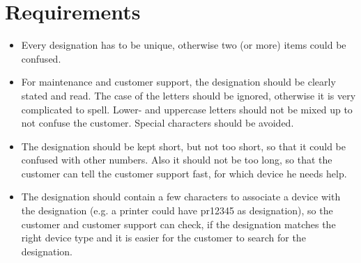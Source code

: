 %
%
%
%
%
%
%

\section{Requirements}

\begin{itemize}
	\item Every designation has to be unique, otherwise two (or more) items
		could be confused.

	\item For maintenance and customer support, the designation should be
		clearly stated and read. The case of the letters should be ignored,
		otherwise it is very complicated to spell. Lower- and uppercase letters
		should not be mixed up to not confuse the customer. Special characters
		should be avoided.

	\item The designation should be kept short, but not too short, so that it
		could be confused with other numbers. Also it should not be too long, so
		that the customer can tell the customer support fast, for which device
		he needs help.

	\item The designation should contain a few characters to associate a device
		with the designation (e.g. a printer could have pr12345 as designation),
		so the customer and customer support can check, if the designation
		matches the right device type and it is easier for the customer to
		search for the designation.
\end{itemize}
